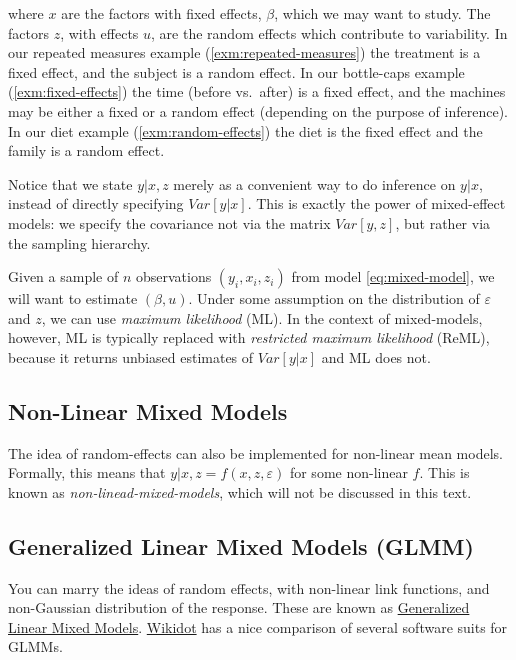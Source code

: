 \documentclass[]{book}
\theoremstyle{definition}
\theoremstyle{definition}
\theoremstyle{definition}
\theoremstyle{remark}
\begin{document}
where \(x\) are the factors with fixed effects, \(\beta\), which we may
want to study. The factors \(z\), with effects \(u\), are the random
effects which contribute to variability. In our repeated measures
example (\ref{exm:repeated-measures}) the treatment is a fixed effect,
and the subject is a random effect. In our bottle-caps example
(\ref{exm:fixed-effects}) the time (before vs.~after) is a fixed effect,
and the machines may be either a fixed or a random effect (depending on
the purpose of inference). In our diet example
(\ref{exm:random-effects}) the diet is the fixed effect and the family
is a random effect.

Notice that we state \(y|x,z\) merely as a convenient way to do
inference on \(y|x\), instead of directly specifying \(Var[y|x]\). This
is exactly the power of mixed-effect models: we specify the covariance
not via the matrix \(Var[y,z]\), but rather via the sampling hierarchy.

Given a sample of \(n\) observations \((y_i,x_i,z_i)\) from model
\eqref{eq:mixed-model}, we will want to estimate \((\beta,u)\). Under some
assumption on the distribution of \(\varepsilon\) and \(z\), we can use
\emph{maximum likelihood} (ML). In the context of mixed-models, however,
ML is typically replaced with \emph{restricted maximum likelihood}
(ReML), because it returns unbiased estimates of \(Var[y|x]\) and ML
does not.

\subsection{Non-Linear Mixed Models}\label{non-linear-mixed-models}

The idea of random-effects can also be implemented for non-linear mean
models. Formally, this means that \(y|x,z=f(x,z,\varepsilon)\) for some
non-linear \(f\). This is known as \emph{non-linead-mixed-models}, which
will not be discussed in this text.

\subsection{Generalized Linear Mixed Models
(GLMM)}\label{generalized-linear-mixed-models-glmm}

You can marry the ideas of random effects, with non-linear link
functions, and non-Gaussian distribution of the response. These are
known as
\href{https://en.wikipedia.org/wiki/Generalized_linear_mixed_model}{Generalized
Linear Mixed Models}.
\href{http://glmm.wikidot.com/pkg-comparison}{Wikidot} has a nice
comparison of several software suits for GLMMs.
\end{document}
